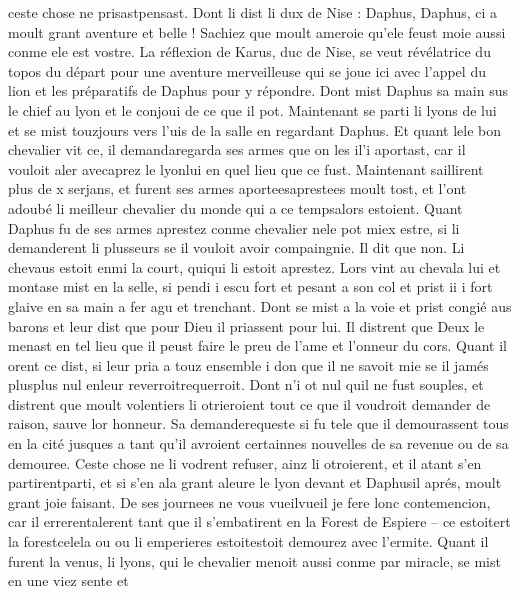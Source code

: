 \documentclass{article}
\begin{document}
\begin{pages}
   ceste chose ne prisastpensast. 
   Dont li dist li dux de Nise : 
   Daphus, Daphus, 
      ci a moult grant aventure et belle ! Sachiez que moult ameroie qu’ele feust moie aussi conme ele est vostre.
   La réflexion de Karus, duc de Nise, se veut révélatrice du topos du départ pour une aventure merveilleuse
      qui se joue ici avec l'appel du lion et les préparatifs de Daphus pour y répondre.
   Dont mist Daphus sa main sus le chief au lyon 
   et le conjoui de ce que il pot. Maintenant se parti li lyons de lui et 
   se mist touzjours vers l’uis de la salle en regardant 
   Daphus. Et quant 
   lele bon chevalier vit ce, 
   il demandaregarda ses armes que on 
      les il'i aportast, 
   car il vouloit aler avecaprez 
   le lyonlui en 
   quel lieu que ce fust. Maintenant saillirent plus de x serjans, et furent ses armes 
   aporteesaprestees moult tost, 
   et l’ont adoubé li meilleur chevalier du monde qui 
      a ce tempsalors estoient. \pend
\pstart Quant Daphus fu de ses armes aprestez 
   conme chevalier nele pot miex estre, 
   si li demanderent li plusseurs 
   se il vouloit avoir compaingnie. Il dit que non. Li chevaus estoit enmi la court, 
   quiqui li estoit aprestez. Lors vint 
   au chevala lui et 
   montase mist en la selle, si pendi i escu fort et pesant a son col 
   et prist ii i fort glaive en sa main a fer agu 
   et trenchant. Dont se mist a la voie et prist congié aus barons et leur dist que 
   pour Dieu il priassent pour lui. Il distrent que 
   Deux le menast en tel lieu que il peust faire le preu de l’ame et l’onneur du cors. 
   Quant il orent ce dist, si leur pria a touz ensemble i don que il ne savoit
   mie se il jamés plusplus nul 
   enleur 
   reverroitrequerroit. 
   Dont n’i ot nul quil ne fust souples, et distrent que moult volentiers li otrieroient 
       tout ce que il voudroit demander de raison, sauve lor honneur. 
   Sa demanderequeste si fu tele que il demourassent tous en 
   la cité jusques
   a tant qu’il avroient certainnes nouvelles de sa revenue ou de sa demouree. Ceste chose ne li vodrent refuser, ainz li otroierent, 
   et il atant s’en 
   partirentparti, et si s’en ala 
   grant aleure le lyon devant et 
   Daphusil aprés, moult grant joie faisant. 
   De ses journees ne vous 
      vueilvueil je fere 
      lonc contemencion, car 
   il errerentalerent 
   tant que il s’embatirent en la Forest de Espiere – ce 
   estoitert 
   la forestcelela ou
   ou li emperieres 
   estoitestoit demourez 
   avec l’ermite. \pend
\pstart Quant il furent la venus, li lyons, 
   qui le chevalier menoit aussi conme par miracle, se mist en une viez sente et 

\end{pages}
\end{document}
